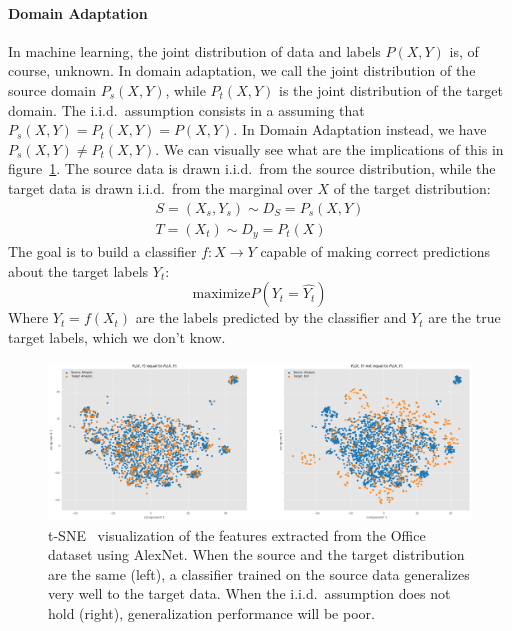 \documentclass[../main.tex]{subfiles}
\begin{document}
    \paragraph{Domain Adaptation}
    In machine learning, the joint distribution of data and labels $P(X, Y)$ is, of course, unknown. In domain adaptation,
    we call the joint distribution of the source domain $ P_{s}(X, Y) $, while $ P_{t}(X, Y) $ is the joint distribution of
    the target domain. The i.i.d.\ assumption consists in a assuming that $ P_{s}(X, Y) = P_{t}(X, Y) = P(X, Y) $.
    In Domain Adaptation instead, we have $ P_{s}(X, Y) \neq P_{t}(X, Y) $. We can visually see what are the implications
    of this in figure~\ref{fig:AD-tsne}.
    \newline
    The source data is drawn i.i.d.\ from the source distribution, while the target data is drawn i.i.d.\ from the marginal
    over $X$ of the target distribution:
    \begin{align*}
        S = (X_{s}, Y_{s}) \sim D_{S} = P_{s}(X, Y) \\
        T = (X_{t}) \sim D_{y} = P_{t}(X)
    \end{align*}
    The goal is to build a classifier $f : X \rightarrow Y$ capable of making correct predictions about the target labels $Y_{t}$:
    $$ \text{maximize}   P(Y_{t} = \hat{Y_{t}}) $$
    Where $\hat{Y_{t}} = f(X_{t})$ are the labels predicted by the classifier and $Y_{t}$ are the true target labels, which we
    don't know.

    \begin{figure}
        \centering{}
    	\includegraphics[width=\linewidth]{img/AD-alexnet-tsne.png}
        \caption{t-SNE~\cite{tsne} visualization of the features extracted from the Office dataset using AlexNet. When the source
        and the target distribution are the same (left), a classifier trained on the source data generalizes very well to the target
        data. When the i.i.d.\ assumption does not hold (right), generalization performance will be poor.}\label{fig:AD-tsne}
	\end{figure}
\end{document}
